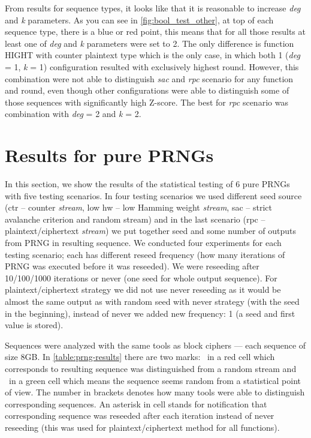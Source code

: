 \documentclass[
    digital,    %
    oneside,    %
    color,
    11pt,
    nocover,
    notable,
    nolof,
    nolot,
    final
]{fithesis3}
\renewcommand\_{\textunderscore\allowbreak}
\newcommand{\cmark}{\ding{51}}%
\newcommand{\xmark}{\ding{55}}%
\begin{document}
From results for sequence types, it looks like that it is reasonable to increase \textit{deg} and \textit{k} parameters. As you can see in \cref{fig:bool_test_other}, at top of each sequence type, there is a blue or red point, this means that for all those results at least one of \textit{deg} and \textit{k} parameters were set to 2. The only difference is function HIGHT with counter plaintext type which is the only case, in which both 1 (\textit{deg} = 1, \textit{k} = 1) configuration resulted with exclusively highest round. However, this combination were not able to distinguish \textit{sac} and \textit{rpc} scenario for any function and round, even though other configurations were able to distinguish some of those sequences with significantly high Z-score. The best for \textit{rpc} scenario was combination with \textit{deg} = 2 and \textit{k} = 2.

\section{Results for pure PRNGs}
\label{sec:results for PRNGs}

In this section, we show the results of the statistical testing of 6 pure PRNGs with five testing scenarios. In four testing scenarios we used different seed source (ctr -- counter \textit{stream}, low hw -- low Hamming weight \textit{stream}, sac -- strict avalanche criterion and random stream) and in the last scenario (rpc -- plaintext/ciphertext \textit{stream}) we put together seed and some number of outputs from PRNG in resulting sequence. We conducted four experiments for each testing scenario; each has different reseed frequency (how many iterations of PRNG was executed before it was reseeded). We were reseeding after 10/100/1000 iterations or never (one seed for whole output sequence). For plaintext/ciphertext strategy we did not use never reseeding as it would be almost the same output as with random seed with never strategy (with the seed in the beginning), instead of never we added new frequency: 1 (a seed and first value is stored). 

Sequences were analyzed with the same tools as block ciphers — each sequence of size 8GB. In \cref{table:prng-results} there are two marks: \xmark~in a red cell which corresponds to resulting sequence was distinguished from a random stream and \cmark~in a green cell which means the sequence seems random from a statistical point of view. The number in brackets denotes how many tools were able to distinguish corresponding sequences. An asterisk in cell stands for notification that corresponding sequence was reseeded after each iteration instead of never reseeding (this was used for plaintext/ciphertext method for all functions).
\end{document}
